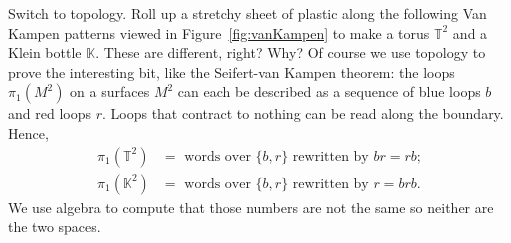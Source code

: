 Switch to topology.   Roll up a stretchy sheet of plastic along the following 
Van Kampen patterns  viewed in Figure~\ref{fig:vanKampen} to make a torus $\mathbb{T}^2$ 
and a Klein bottle $\mathbb{K}$.  These are different, right?  Why?  Of course we use topology 
to prove the interesting bit, like the Seifert-van Kampen theorem: the loops 
$\pi_1(M^2)$ on a surfaces $M^2$ can each be described as a sequence of blue loops $b$ and red loops $r$.
Loops that contract to nothing can be read along the boundary.  Hence,
\begin{align*}
    \pi_1(\mathbb{T}^2) &= \text{ words over }\{b,r\} \text{ rewritten by }br=rb;
    \\
    \pi_1(\mathbb{K}^2) &= \text{ words over }\{b,r\} \text{ rewritten by } r=brb. 
\end{align*}
We use algebra to compute that those numbers are not the same so neither are the two spaces.
